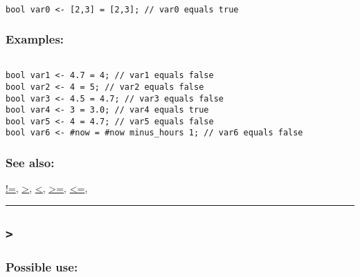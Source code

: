 \documentclass[]{book}
\theoremstyle{definition}
\theoremstyle{definition}
\theoremstyle{definition}
\theoremstyle{remark}
\begin{document}
\begin{verbatim}
 
bool var0 <- [2,3] = [2,3]; // var0 equals true
\end{verbatim}

\subsubsection{Examples:}\label{examples-9}

\begin{verbatim}
 
bool var1 <- 4.7 = 4; // var1 equals false 
bool var2 <- 4 = 5; // var2 equals false 
bool var3 <- 4.5 = 4.7; // var3 equals false 
bool var4 <- 3 = 3.0; // var4 equals true 
bool var5 <- 4 = 4.7; // var5 equals false 
bool var6 <- #now = #now minus_hours 1; // var6 equals false
\end{verbatim}

\subsubsection{See also:}\label{see-also-11}

\href{OperatorsAA\#!=}{!=}, \href{OperatorsAA\#\%3E}{\textgreater{}},
\href{OperatorsAA\#\%3C}{\textless{}},
\href{OperatorsAA\#\%3E=}{\textgreater{}=},
\href{OperatorsAA\#\%3C=}{\textless{}=},

\begin{center}\rule{0.5\linewidth}{\linethickness}\end{center}

\subsection{\texorpdfstring{\texttt{\textgreater{}}}{\textgreater{}}}\label{section-17}

\subsubsection{Possible use:}\label{possible-use-14}
\end{document}
